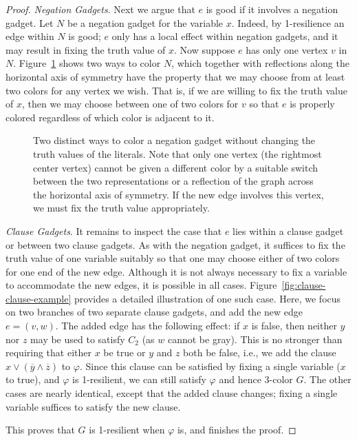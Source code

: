 \documentclass[10pt]{article}
\begin{document}
\begin{proof}
\emph{Negation Gadgets}. Next we argue that $e$ is good if it involves a
negation gadget. Let $N$ be a negation gadget for the variable $x$. Indeed, by
1-resilience an edge within $N$ is good; $e$ only has a local effect within
negation gadgets, and it may result in fixing the truth value of $x$. Now
suppose $e$ has only one vertex $v$ in $N$. Figure~\ref{fig:coloring-negation}
shows two ways to color $N$, which together with reflections along the
horizontal axis of symmetry have the property that we may choose from at least
two colors for any vertex we wish. That is, if we are willing to fix the truth
value of $x$, then we may choose between one of two colors for $v$ so that $e$
is properly colored regardless of which color is adjacent to it.  

\begin{figure}
\centering
{}
\caption{Two distinct ways to color a negation gadget without changing the
truth values of the literals. Note that only one vertex (the rightmost center
vertex) cannot be given a different color by a suitable switch between the two
representations or a reflection of the graph across the horizontal axis of
symmetry. If the new edge involves this vertex, we must fix the truth value
appropriately.}
\label{fig:coloring-negation}
\end{figure}

\emph{Clause Gadgets}. It remains to inspect the case that $e$ lies within a
clause gadget or between two clause gadgets. As with the negation gadget, it
suffices to fix the truth value of one variable suitably so that one may choose
either of two colors for one end of the new edge. Although it is not always
necessary to fix a variable to accommodate the new edges, it is possible in all
cases.  Figure~\ref{fig:clause-clause-example} provides a detailed illustration
of one such case. Here, we focus on two branches of two separate clause
gadgets, and add the new edge $e = (v,w)$. The added edge has the following
effect: if $x$ is false, then neither $y$ nor $z$ may be used to satisfy $C_2$
(as $w$ cannot be gray). This is no stronger than requiring that either $x$ be
true or $y$ and $z$ both be false, i.e., we add the clause $x \vee
(\overline{y} \wedge \overline{z})$ to $\varphi$. Since this clause can be
satisfied by fixing a single variable ($x$ to true), and $\varphi$ is
1-resilient, we can still satisfy $\varphi$ and hence 3-color $G$. The other
cases are nearly identical, except that the added clause changes; fixing a
single variable suffices to satisfy the new clause. 

This proves that $G$ is 1-resilient when $\varphi$ is, and finishes the proof.
\end{proof}
\end{document}
